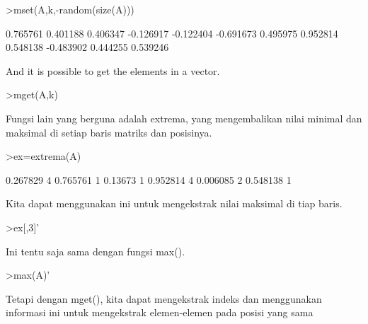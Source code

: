 \documentclass{article}
\begin{document}
\begin{eulernotebook}
\begin{eulerprompt}
>mset(A,k,-random(size(A)))
\end{eulerprompt}
\begin{euleroutput}
       0.765761      0.401188      0.406347     -0.126917 
      -0.122404     -0.691673      0.495975      0.952814 
       0.548138     -0.483902      0.444255      0.539246 
\end{euleroutput}
\begin{eulercomment}
And it is possible to get the elements in a vector.
\end{eulercomment}
\begin{eulerprompt}
>mget(A,k)
\end{eulerprompt}
\begin{euleroutput}
  [0.267829,  0.13673,  0.390567,  0.006085]
\end{euleroutput}
\begin{eulercomment}
Fungsi lain yang berguna adalah extrema, yang mengembalikan nilai
minimal dan maksimal di setiap baris matriks dan posisinya.
\end{eulercomment}
\begin{eulerprompt}
>ex=extrema(A)
\end{eulerprompt}
\begin{euleroutput}
       0.267829             4      0.765761             1 
        0.13673             1      0.952814             4 
       0.006085             2      0.548138             1 
\end{euleroutput}
\begin{eulercomment}
Kita dapat menggunakan ini untuk mengekstrak nilai maksimal di tiap
baris.
\end{eulercomment}
\begin{eulerprompt}
>ex[,3]'
\end{eulerprompt}
\begin{euleroutput}
  [0.765761,  0.952814,  0.548138]
\end{euleroutput}
\begin{eulercomment}
Ini tentu saja sama dengan fungsi max().
\end{eulercomment}
\begin{eulerprompt}
>max(A)'
\end{eulerprompt}
\begin{euleroutput}
  [0.765761,  0.952814,  0.548138]
\end{euleroutput}
\begin{eulercomment}
Tetapi dengan mget(), kita dapat mengekstrak indeks dan menggunakan
informasi ini untuk mengekstrak elemen-elemen pada posisi yang sama

\end{eulercomment}
\end{eulernotebook}
\end{document}

